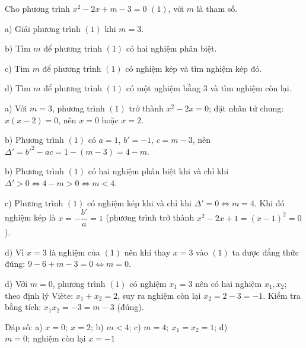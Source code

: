 \begin{problem}[9DS-PT2-042]
Cho phương trình $x^2 - 2x + m - 3 = 0$ $(1)$, với $m$ là tham số.

a) Giải phương trình $(1)$ khi $m = 3$.

b) Tìm $m$ để phương trình $(1)$ có hai nghiệm phân biệt.

c) Tìm $m$ để phương trình $(1)$ có nghiệm kép và tìm nghiệm kép đó.

d) Tìm $m$ để phương trình $(1)$ có một nghiệm bằng $3$ và tìm nghiệm còn lại.

\begin{solution}
a) Với $m = 3$, phương trình $(1)$ trở thành $x^2 - 2x = 0$; đặt nhân tử chung: $x(x - 2) = 0$, nên $x = 0$ hoặc $x = 2$.

b) Phương trình $(1)$ có $a = 1$, $b' = -1$, $c = m - 3$, nên $\Delta' = b'^2 - ac = 1 - (m - 3) = 4 - m$.

b) Phương trình $(1)$ có hai nghiệm phân biệt khi và chỉ khi $\Delta' > 0 \Leftrightarrow 4 - m > 0 \Leftrightarrow m < 4$.

c) Phương trình $(1)$ có nghiệm kép khi và chỉ khi $\Delta' = 0 \Leftrightarrow m = 4$. Khi đó nghiệm kép là $x = -\dfrac{b'}{a} = 1$ (phương trình trở thành $x^2 - 2x + 1 = (x - 1)^2 = 0$).

d) Vì $x = 3$ là nghiệm của $(1)$ nên khi thay $x = 3$ vào $(1)$ ta được đẳng thức đúng: $9 - 6 + m - 3 = 0 \Leftrightarrow m = 0$.

d) Với $m = 0$, phương trình $(1)$ có nghiệm $x_1 = 3$ nên có hai nghiệm $x_1, x_2$; theo định lý Viète: $x_1 + x_2 = 2$, suy ra nghiệm còn lại $x_2 = 2 - 3 = -1$. Kiểm tra bằng tích: $x_1x_2 = -3 = m - 3$ (đúng).

Đáp số: a) $\boxed{x = 0;\ x = 2}$; b) $\boxed{m < 4}$; c) $\boxed{m = 4;\ x_1 = x_2 = 1}$; d) $\boxed{m = 0;\ \text{nghiệm còn lại } x = -1}$
\end{solution}
\end{problem}

